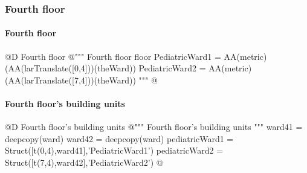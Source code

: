 \documentclass[11pt,oneside]{article}    %
\begin{document}
\subsubsection{Fourth floor}
\paragraph{Fourth floor}
@D Fourth floor
@{""" Fourth floor floor 
PediatricWard1 = AA(metric)(AA(larTranslate([0,4]))(theWard))
PediatricWard2 = AA(metric)(AA(larTranslate([7,4]))(theWard)) """
@}

\paragraph{Fourth floor's building units}
@D Fourth floor's building units 
@{""" Fourth floor's building units """
ward41 = deepcopy(ward)
ward42 = deepcopy(ward)
pediatricWard1 = Struct([t(0,4),ward41],'PediatricWard1')
pediatricWard2 = Struct([t(7,4),ward42],'PediatricWard2')
@}
\end{document}
